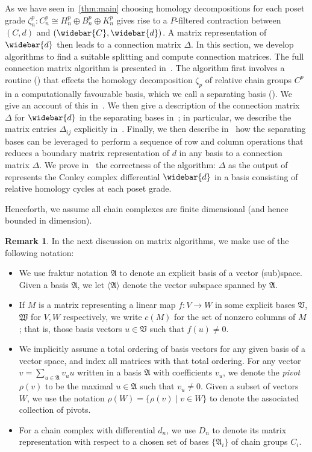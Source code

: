 \documentclass[11pt, table, nothms]{amsart}
\theoremstyle{definition}
\newtheorem{remark}[theorem]{Remark}
\newcommand{\fA}{\mathfrak{A}}
\newcommand{\oC}{\widebar{C}}
\newcommand{\od}{\widebar{d}}
\begin{document}
{As we have seen in~\cref{thm:main} choosing homology decompositions for each poset grade $\zeta^p_n\colon C^p_n \cong H^p_n \oplus B^p_n \oplus K^p_n$ gives rise to a $P$-filtered contraction between $(C,d)$ and $(\oC, \od)$.
A matrix representation of $\od$ then leads to a connection matrix $\Delta$. 
In this section, we develop algorithms to find a suitable splitting and  compute connection matrices. 
The full connection matrix algorithm is presented in~. 
The algorithm first involves a routine () that effects the homology decomposition $\zeta_p$ of relative chain groups $C^p$ in a computationally favourable basis, which we call a separating basis (). We give an account of this in~. We then give a description of the connection matrix $\Delta$ for $\od$ in the separating bases in~; in particular, we describe the matrix entries $\Delta_{ij}$ explicitly in~. Finally, we then describe in~ how the separating bases can be leveraged to perform a sequence of row and column operations that reduces a boundary matrix representation of $d$ in any basis to a connection matrix $\Delta$. We prove in~ the correctness of the algorithm: $\Delta$ as the output of~ represents the Conley complex differential $\od$ in a basis consisting of relative homology cycles at each poset grade. 

Henceforth, we assume all chain complexes are finite dimensional (and hence bounded in dimension).
\begin{remark}
    In the next discussion on matrix algorithms, we make use of the following notation:
    \begin{itemize}
        \item We use fraktur notation $\fA$ to denote an explicit basis of a vector (sub)space. Given a basis $\fA$, we let $\langle \fA \rangle$ denote the vector subspace spanned by $\fA$.
        \item  If $M$ is a matrix representing a linear map $f: V \to W$ in some explicit bases $\mathfrak{V}$, $\mathfrak{W}$ for $V,W$ respectively, we write $c(M)$ for the %
        set of nonzero columns of $M$; that is, those basis vectors $u \in \mathfrak{V}$ such that $f(u) \neq 0$.
        \item We implicitly assume a total ordering of basis vectors for any given basis of a vector space, and index all matrices with that total ordering. For any vector $v=\sum_{u \in \fA}v_u u$ written in a basis $\fA$ with coefficients $v_u$, we denote the \emph{pivot} $\rho(v)$ to be the maximal $u \in \fA$ such that $v_u \neq 0$. Given a subset of vectors~$W$, we use the notation $\rho(W)=\{\rho(v) \mid v \in W\}$ to denote the associated collection of pivots.
        \item For a chain complex with differential $d_n$, we use $D_n$ to denote its matrix representation with respect to a chosen set of bases $\{\fA_i\}$ of chain groups $C_i$.  
    \end{itemize}
\end{remark}

}
\end{document}
